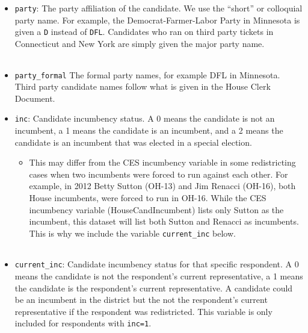 \documentclass[12pt]{article}
\begin{document}
\begin{itemize}[leftmargin=*]
\item \texttt{party}: The party affiliation of the candidate. We use the ``short'' or colloquial party name. For example, the Democrat-Farmer-Labor Party in Minnesota is given a \texttt{D} instead of \texttt{DFL}. Candidates who ran on third party tickets in Connecticut and New York are simply given the major party name.   %



\begin{tabularx}{\linewidth}{C}
  
\end{tabularx}

\item \texttt{party\_formal} The formal party names, for example DFL in Minnesota. Third party candidate names follow what is given in the House Clerk Document. 

\item \texttt{inc}: Candidate incumbency status. A 0 means the candidate is not an incumbent, a 1 means the candidate is an incumbent, and a 2 means the candidate is an incumbent that was elected in a special election. 
\begin{itemize}
\item This may differ from the CES incumbency variable in some redistricting cases when two incumbents were forced to run against each other. For example, in 2012 Betty Sutton (OH-13) and Jim Renacci (OH-16), both House incumbents, were forced to run in OH-16. While the CES incumbency variable (HouseCandIncumbent) lists only Sutton as the incumbent, this dataset will list both Sutton and Renacci as incumbents. This is why we include the variable  \texttt{current\_inc} below.  
\end{itemize}

    \begin{tabularx}{\linewidth}{C}
    
    \end{tabularx}

\item \texttt{current\_inc}: Candidate incumbency status for that specific respondent. A 0 means the candidate is not the respondent's current representative, a 1 means the candidate is the respondent's current representative. A candidate could be an incumbent in the district but the not the respondent's current representative if the respondent was redistricted. This variable is only included for respondents with \texttt{inc=1}.


\end{itemize}
\end{document}
